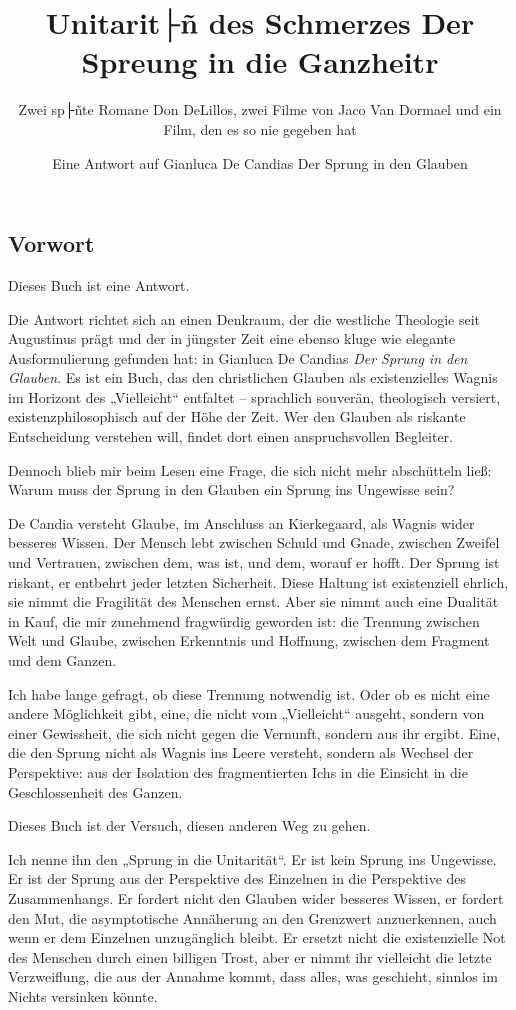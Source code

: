 \documentclass[
  ngerman,
]{article}
\title{Unitarit├ñ des Schmerzes Der Spreung in die Ganzheitr}
\subtitle{Zwei sp├ñte Romane Don DeLillos, zwei Filme von Jaco Van
Dormael und ein Film, den es so nie gegeben hat}
\author{Eine Antwort auf Gianluca De Candias Der Sprung in den Glauben}
\date{}
\begin{document}
\maketitle

{
\setcounter{tocdepth}{3}
\tableofcontents
}
\subsection{\texorpdfstring{\textbf{Vorwort}}{Vorwort}}\label{vorwort}

Dieses Buch ist eine Antwort.

Die Antwort richtet sich an einen Denkraum, der die westliche Theologie
seit Augustinus prägt und der in jüngster Zeit eine ebenso kluge wie
elegante Ausformulierung gefunden hat: in Gianluca De Candias \emph{Der
Sprung in den Glauben}. Es ist ein Buch, das den christlichen Glauben
als existenzielles Wagnis im Horizont des „Vielleicht`` entfaltet --
sprachlich souverän, theologisch versiert, existenzphilosophisch auf der
Höhe der Zeit. Wer den Glauben als riskante Entscheidung verstehen will,
findet dort einen anspruchsvollen Begleiter.

Dennoch blieb mir beim Lesen eine Frage, die sich nicht mehr abschütteln
ließ: Warum muss der Sprung in den Glauben ein Sprung ins Ungewisse
sein?

De Candia versteht Glaube, im Anschluss an Kierkegaard, als Wagnis
wider besseres Wissen. Der Mensch lebt zwischen Schuld und Gnade,
zwischen Zweifel und Vertrauen, zwischen dem, was ist, und dem, worauf
er hofft. Der Sprung ist riskant, er entbehrt jeder letzten Sicherheit.
Diese Haltung ist existenziell ehrlich, sie nimmt die Fragilität des
Menschen ernst. Aber sie nimmt auch eine Dualität in Kauf, die mir
zunehmend fragwürdig geworden ist: die Trennung zwischen Welt und
Glaube, zwischen Erkenntnis und Hoffnung, zwischen dem Fragment und dem
Ganzen.

Ich habe lange gefragt, ob diese Trennung notwendig ist. Oder ob es
nicht eine andere Möglichkeit gibt, eine, die nicht vom „Vielleicht``
ausgeht, sondern von einer Gewissheit, die sich nicht gegen die
Vernunft, sondern aus ihr ergibt. Eine, die den Sprung nicht als Wagnis
ins Leere versteht, sondern als Wechsel der Perspektive: aus der
Isolation des fragmentierten Ichs in die Einsicht in die Geschlossenheit
des Ganzen.

Dieses Buch ist der Versuch, diesen anderen Weg zu gehen.

Ich nenne ihn den „Sprung in die Unitarität``. Er ist kein Sprung ins
Ungewisse. Er ist der Sprung aus der Perspektive des Einzelnen in die
Perspektive des Zusammenhangs. Er fordert nicht den Glauben wider
besseres Wissen, er fordert den Mut, die asymptotische Annäherung an
den Grenzwert anzuerkennen, auch wenn er dem Einzelnen unzugänglich
bleibt. Er ersetzt nicht die existenzielle Not des Menschen durch einen
billigen Trost, aber er nimmt ihr vielleicht die letzte Verzweiflung,
die aus der Annahme kommt, dass alles, was geschieht, sinnlos im Nichts
versinken könnte.
\end{document}
